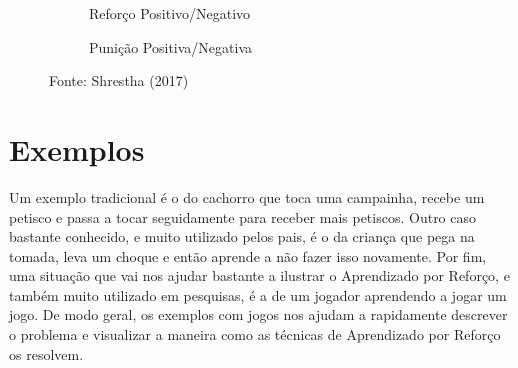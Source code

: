 \documentclass{article}
\begin{document}
                \begin{figure}[ht]
                    \centering
                    \begin{subfigure}[b]{.45\textwidth}
                        \centering
                        \caption{Reforço Positivo/Negativo}
                    \end{subfigure}
                    \begin{subfigure}[b]{.45\textwidth}
                        \centering
                        \caption{Punição Positiva/Negativa}
                    \end{subfigure}
                    \caption{Fonte: Shrestha (2017)}
                    \label{fig:reforco-punicao}
                \end{figure}
            
    \section{Exemplos}
    
        Um exemplo tradicional é o do cachorro que toca uma campainha, recebe um petisco e passa a tocar seguidamente para receber mais petiscos. Outro caso bastante conhecido, e muito utilizado pelos pais, é o da criança que pega na tomada, leva um choque e então aprende a não fazer isso novamente. Por fim, uma situação que vai nos ajudar bastante a ilustrar o Aprendizado por Reforço, e também muito utilizado em pesquisas, é a de um jogador aprendendo a jogar um jogo. De modo geral, os exemplos com jogos nos ajudam a rapidamente descrever o problema e visualizar a maneira como as técnicas de Aprendizado por Reforço os resolvem.
            
\end{document}
